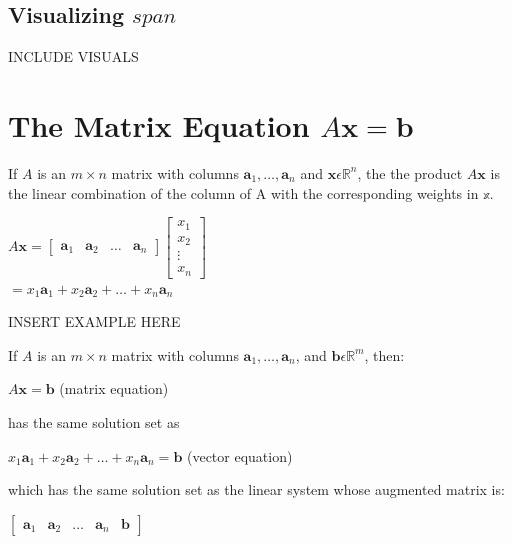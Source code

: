 \documentclass{report}
\begin{document}
\subsection*{Visualizing $span$}
\begin{center}
	INCLUDE VISUALS
\end{center}
\section{The Matrix Equation $A\mathbf{x}=\mathbf{b}$}
\begin{definition}
	If $A$ is an $m\times n$ matrix with columns $\mathbf{a}_1,\ldots, \mathbf{a}_n$ and $\mathbf{x}\epsilon \mathbb{R}^n$, the the product $A\mathbf{x}$ is the linear combination of the column of A with the corresponding weights in $\mathbb{x}$.
	\begin{center}
		$A\mathbf{x} = \begin{bmatrix} \mathbf{a}_1 & \mathbf{a}_2 & \ldots & \mathbf{a}_n \end{bmatrix}\begin{bmatrix}
			x_1 \\
			x_2 \\
			\vdots \\
			x_n
		\end{bmatrix}$\\\vspace{3mm}
		$=x_1\mathbf{a}_1 + x_2\mathbf{a}_2 + \ldots + x_n\mathbf{a}_n$
	\end{center}
\end{definition}
\begin{center}
	INSERT EXAMPLE HERE
\end{center}
\begin{theorem}
	If $A$ is an $m\times n$ matrix with columns $\mathbf{a}_1,\ldots, \mathbf{a}_n$, and $\mathbf{b}\epsilon \mathbb{R}^m$, then:
	\begin{center}
		$A\mathbf{x}=\mathbf{b}$ (matrix equation)
	\end{center}
	has the same solution set as
	\begin{center}
		$x_1\mathbf{a}_1 + x_2\mathbf{a}_2 + \ldots + x_n\mathbf{a}_n = \mathbf{b}$ (vector equation)
	\end{center}
	which has the same solution set as the linear system whose augmented matrix is:
	\begin{center}
		$\begin{bmatrix} \mathbf{a}_1 & \mathbf{a}_2 & \ldots & \mathbf{a}_n & \mathbf{b} \end{bmatrix}$
	\end{center}
\end{theorem}
\end{document}
